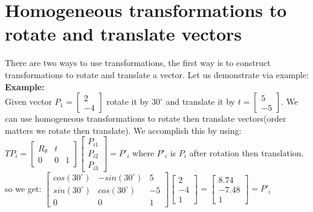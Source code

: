 \documentclass{article}
\begin{document}
\section{Homogeneous transformations to rotate and translate vectors}
There are two ways to use transformations, the first way is to construct transformations to rotate and translate a vector. Let us demonstrate via example: \\
\textbf{Example: }\\
Given vector $P_1=\begin{bmatrix}
2\\
-4
\end{bmatrix}$ rotate it by $30^\circ$ and translate it by $t=\begin{bmatrix}
5 \\
-5
\end{bmatrix}$.
We can use homogeneous transformations to rotate then translate vectors(order matters we rotate then translate). We accomplish this by using: \\
$T P_i = \begin{bmatrix}
R_\theta & t\\
0 & 0 & 1
\end{bmatrix}\begin{bmatrix}
P_{i1}\\
P_{i2}\\
P_{i3}
\end{bmatrix}= P'_{i}$ where $P'_{i}$ is $P_i$ after rotation then translation.\\ so we get: $\begin{bmatrix}
cos(30^\circ) & -sin(30^\circ) & 5\\
sin(30^\circ) & cos(30^\circ) & -5\\
0 & 0 & 1
\end{bmatrix}\begin{bmatrix}
2\\
-4\\
1
\end{bmatrix}=\begin{bmatrix}
8.74\\
-7.48\\
1
\end{bmatrix}=P'_{i}$\\
\end{document}
